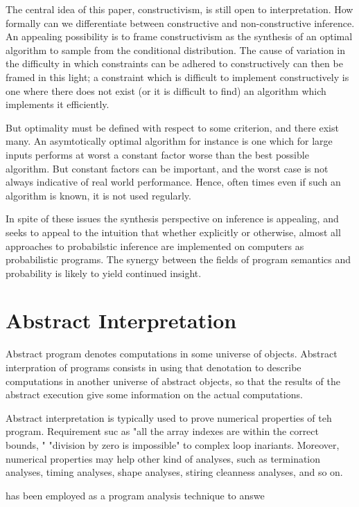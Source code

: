 The central idea of this paper, constructivism, is still open to interpretation.
How formally can we differentiate between constructive and non-constructive inference.
An appealing possibility is to frame constructivism as the synthesis of an optimal algorithm to sample from the conditional distribution.
The cause of variation in the difficulty in which constraints can be adhered to constructively can then be framed in this light; a constraint which is difficult to implement constructively is one where there does not exist (or it is difficult to find) an algorithm which implements it efficiently.

But optimality must be defined with respect to some criterion, and there exist many.
An asymtotically optimal algorithm for instance is one which for large inputs performs at worst a constant factor worse than the best possible algorithm.
But constant factors can be important, and the worst case is not always indicative of real world performance.
Hence, often times even if such an algorithm is known, it is not used regularly.

In spite of these issues the synthesis perspective on inference is appealing, and seeks to appeal to the intuition that whether explicitly or otherwise, almost all approaches to probabilstic inference are implemented on computers as probabilistic programs.
The synergy between the fields of program semantics and probability is likely to yield continued insight.

\section{Abstract Interpretation}
Abstract program denotes computations in some universe of objects.
Abstract interpration of programs consists in using that denotation to describe computations in another universe of abstract objects, so that the results of the abstract execution give some information on the actual computations.

Abstract interpretation is typically used to prove numerical properties of teh program.  Requirement suc as "all the array indexes are within the correct bounds, " "division by zero is impossible" to complex loop inariants.
Moreover, numerical properties may help other kind of analyses, such as termination analyses, timing analyses, shape analyses, stiring cleanness analyses, and so on.

has been employed as a program analysis technique to answe

